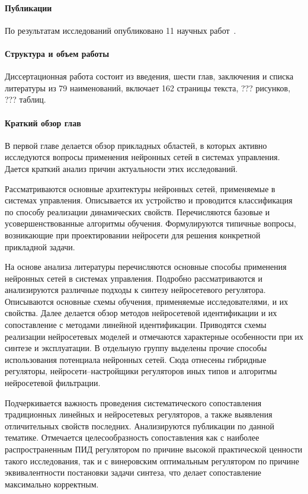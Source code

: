 \paragraph{Публикации}
По результатам исследований опубликовано 11 научных
работ~\cite{elfil-pta99,
filelav-ict99,filel-ict2000,filel-ist2000,elfil-iwk2000,filel-ict2003,
el-neurocomp2002,elzenk-extrob2006,elfil-modctrl2006,filel-iwk2010,
elfil-vestmei2010}.

\paragraph{Структура и объем работы}
Диссертационная работа состоит из введения, шести глав, заключения и
списка литературы из 79 наименований, включает 162 страницы текста, ???
рисунков, ??? таблиц.

\paragraph{Краткий обзор глав}


В первой главе делается обзор прикладных областей, в которых активно
исследуются вопросы применения нейронных сетей в системах управления.
Дается краткий анализ причин актуальности этих исследований.

Рассматриваются основные архитектуры нейронных сетей, применяемые в
системах управления.  Описывается их устройство и проводится
классификация по способу реализации динамических свойств.
Перечисляются базовые и усовершенствованные алгоритмы обучения.
Формулируются типичные вопросы, возникающие при проектировании
нейросети для решения конкретной прикладной задачи.

На основе анализа литературы перечисляются основные способы применения
нейронных сетей в системах управления.  Подробно рассматриваются и
анализируются различные подходы к синтезу нейросетевого регулятора.
Описываются основные схемы обучения, применяемые исследователями, и их
свойства.  Далее делается обзор методов нейросетевой идентификации и
их сопоставление с методами линейной идентификации.  Приводятся схемы
реализации нейросетевых моделей и отмечаются характерные особенности
при их синтезе и эксплуатации.  В отдельную группу выделены прочие
способы использования потенциала нейронных сетей.  Сюда отнесены
гибридные регуляторы, нейросети--настройщики регуляторов иных типов и
алгоритмы нейросетевой фильтрации.

Подчеркивается важность проведения систематического сопоставления
традиционных линейных и нейросетевых регуляторов, а также выявления
отличительных свойств последних.  Анализируются публикации по данной
тематике.  Отмечается целесообразность сопоставления как с наиболее
распространенным ПИД регулятором по причине высокой практической
ценности такого исследования, так и с винеровским оптимальным
регулятором по причине эквивалентности постановки задачи синтеза, что
делает сопоставление максимально корректным.

